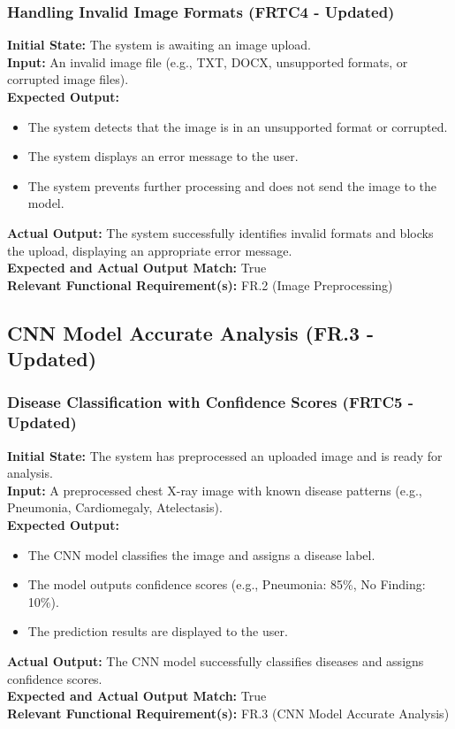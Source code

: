 \documentclass[12pt, titlepage]{article}
\begin{document}
\subsubsection{Handling Invalid Image Formats (FRTC4 - Updated)}
\textbf{Initial State:} The system is awaiting an image upload.\\
\textbf{Input:} An invalid image file (e.g., TXT, DOCX, unsupported formats, or corrupted image files).\\
\textbf{Expected Output:}
\begin{itemize}
\item The system detects that the image is in an unsupported format or corrupted.
\item The system displays an error message to the user.
\item The system prevents further processing and does not send the image to the model.
\end{itemize}
\textbf{Actual Output:} The system successfully identifies invalid formats and blocks the upload, displaying an appropriate error message.\\
\textbf{Expected and Actual Output Match:} True\\
\textbf{Relevant Functional Requirement(s):} FR.2 (Image Preprocessing)\\

\subsection{CNN Model Accurate Analysis (FR.3 - Updated)}
\subsubsection{Disease Classification with Confidence Scores (FRTC5 - Updated)}
\textbf{Initial State:} The system has preprocessed an uploaded image and is ready for analysis.\\
\textbf{Input:} A preprocessed chest X-ray image with known disease patterns (e.g., Pneumonia, Cardiomegaly, Atelectasis).\\
\textbf{Expected Output:}
\begin{itemize}
\item The CNN model classifies the image and assigns a disease label.
\item The model outputs confidence scores (e.g., Pneumonia: 85\%, No Finding: 10\%).
\item The prediction results are displayed to the user.
\end{itemize}
\textbf{Actual Output:} The CNN model successfully classifies diseases and assigns confidence scores.\\
\textbf{Expected and Actual Output Match:} True\\
\textbf{Relevant Functional Requirement(s):} FR.3 (CNN Model Accurate Analysis)\\
\end{document}

